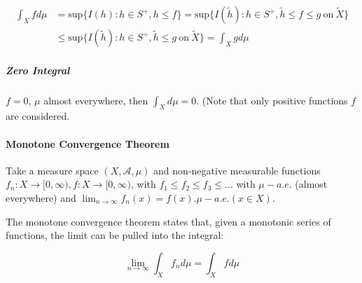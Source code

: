 \begin{equation}
\begin{array}{rl}
\int_X f d\mu &= \mathrm{sup}\{ I(h): h\in S^+, h\leq f \} =  \mathrm{sup}\{ I(\tilde{h}): h\in S^+, \tilde{h}\leq f \leq g\mathrm{\ on\ }\tilde{X}\}\\
&\leq \mathrm{sup}\{ I(\tilde{h}): h\in S^+, \tilde{h}\leq g\mathrm{\ on\ }\tilde{X}\} = \int_X g d\mu
\end{array}
\end{equation}

\subparagraph{Zero Integral}
$f=0$, $\mu$ almost everywhere, then $\int_X d\mu = 0$. (Note that only positive functions $f$ are considered.




\paragraph{Monotone Convergence Theorem}

Take a measure space $(X,\mathscr{A},\mu)$ and non-negative measurable functions $f_n: X \rightarrow [0,\infty), f: X \rightarrow [0,\infty)$, with $f_1 \leq f_2 \leq f_3 \leq ... $ with $\mu-a.e.$ (almost everywhere) and $\lim_{n\rightarrow \infty} f_n(x) = f(x). \mu-a.e. (x\in X)$.

The monotone convergence theorem states that, given a monotonic series of functions, the limit can be pulled into the integral:

\begin{equation}
\lim_{n\rightarrow \infty} \int_X f_n d\mu = \int_X f d\mu
\end{equation}


